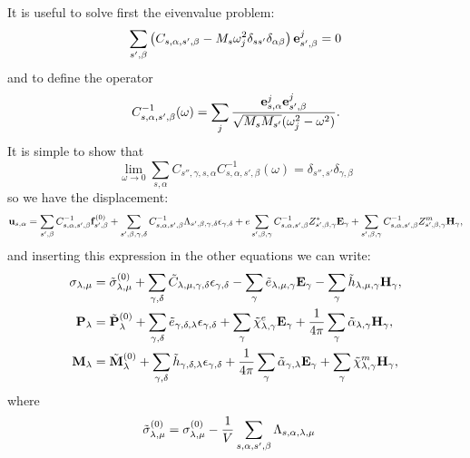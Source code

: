 \documentclass[12pt,a4paper]{article}
\begin{document}
{It is useful to solve first the eivenvalue problem:
\begin{equation}
\sum_{s',\beta} \left(C_{s,\alpha,s',\beta} - 
M_s \omega_j^2 \delta_{ss'}\delta_{\alpha\beta}\right){\bf e}^j_{s',\beta}=0
\end{equation}
and to define the operator
\begin{equation}
C^{-1}_{s,\alpha,s',\beta}(\omega) = \sum_j {{\bf e}^j_{s,\alpha} {\bf e}^j_{s',\beta}
\over \sqrt{M_s M_{s'}}(\omega^2_j - \omega^2)}.
\end{equation}
It is simple to show that
\begin{equation}
\lim_{\omega\rightarrow 0} \sum_{s,\alpha} C_{s'',\gamma,s,\alpha} C^{-1}_{s,\alpha,s',\beta}(\omega)
=\delta_{s'',s'} \delta_{\gamma,\beta}
\end{equation}
so we have the displacement:
\begin{equation}
{\bf u}_{s,\alpha}=\sum_{s',\beta} C^{-1}_{s,\alpha,s',\beta}
{\bf f}^{(0)}_{s',\beta} + \sum_{s',\beta,\gamma,\delta} 
C^{-1}_{s,\alpha,s',\beta}
\Lambda_{s',\beta,\gamma,\delta} \epsilon_{\gamma,\delta}
+ e \sum_{s',\beta,\gamma} C^{-1}_{s,\alpha,s',\beta}
Z^*_{s',\beta,\gamma} {\bf E}_{\gamma} 
+ \sum_{s',\beta,\gamma} C^{-1}_{s,\alpha,s',\beta} Z^m_{s',\beta,\gamma} 
{\bf H}_{\gamma},
\end{equation}
and inserting this expression in the other equations we can write:
\begin{align}
\sigma_{\lambda,\mu}&= \tilde \sigma_{\lambda,\mu}^{(0)}
+\sum_{\gamma,\delta} \tilde C_{\lambda,\mu,\gamma,\delta}  
\epsilon_{\gamma,\delta} -
\sum_{\gamma} \tilde e_{\lambda,\mu,\gamma} 
 {\bf E}_{\gamma}
-\sum_{\gamma}  \tilde h_{\lambda,\mu,\gamma} 
{\bf H}_{\gamma}, \\
{\bf P}_{\lambda}&= \tilde {\bf P}^{(0)}_{\lambda}
+\sum_{\gamma,\delta} \tilde e_{\gamma,\delta,\lambda} 
\epsilon_{\gamma,\delta} +
\sum_{\gamma} 
\tilde \chi^e_{\lambda,\gamma}
{\bf E}_{\gamma} +
{1\over 4 \pi}\sum_{\gamma} \tilde \alpha_{\lambda,\gamma} 
{\bf H}_{\gamma}, \\
{\bf M}_{\lambda}&= \tilde {\bf M}^{(0)}_{\lambda}
+\sum_{\gamma,\delta}  \tilde h_{\gamma,\delta,\lambda} 
\epsilon_{\gamma,\delta} 
+{1\over 4 \pi} \sum_{\gamma} \tilde \alpha_{\gamma,\lambda} {\bf E}_{\gamma}
+\sum_{\gamma} 
\tilde \chi^m_{\lambda,\gamma}
{\bf H}_{\gamma},
\end{align}
where 
\begin{align}
\tilde \sigma^{(0)}_{\lambda,\mu}&= \sigma^{(0)}_{\lambda,\mu}
-{1\over V} \sum_{s,\alpha,s',\beta} \Lambda_{s,\alpha,\lambda,\mu}

\end{align}}
\end{document}
